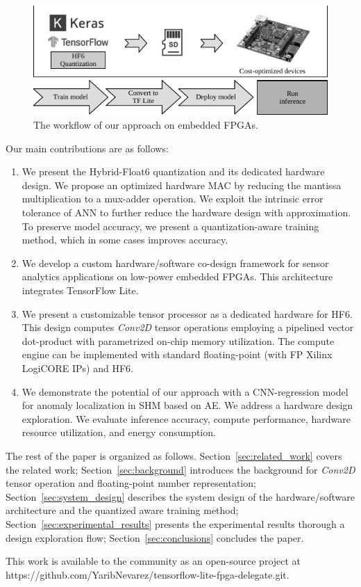 \begin{figure}[b!]
	\centering
	\includegraphics[width=0.5\columnwidth]{./chapters/cnn_accelerator/figures/workflow.pdf}
	\caption{The workflow of our approach on embedded FPGAs.}
	\label{fig:workflow}
\end{figure}

Our main contributions are as follows:
\begin{enumerate}
	\item
	
	We present the Hybrid-Float6 quantization and its dedicated hardware design. We propose an optimized hardware MAC by reducing the mantissa multiplication to a mux-adder operation. We exploit the intrinsic error tolerance of ANN to further reduce the hardware design with approximation. To preserve model accuracy, we present a quantization-aware training method, which in some cases improves accuracy.
	
	\item We develop a custom hardware/software co-design framework for sensor analytics applications on low-power embedded FPGAs. This architecture integrates TensorFlow Lite.
	\item We present a customizable tensor processor as a dedicated hardware for HF6. This design computes \emph{Conv2D} tensor operations employing a pipelined vector dot-product with parametrized on-chip memory utilization. The compute engine can be implemented with standard floating-point (with FP Xilinx LogiCORE IPs) and HF6.
	\item We demonstrate the potential of our approach with a CNN-regression model for anomaly localization in SHM based on AE. We address a hardware design exploration. We evaluate inference accuracy, compute performance, hardware resource utilization, and energy consumption.
\end{enumerate}

The rest of the paper is organized as follows. Section~\ref{sec:related_work} covers the related work; Section~\ref{sec:background} introduces the background for \emph{Conv2D} tensor operation and floating-point number representation; Section~\ref{sec:system_design} describes the system design of the hardware/software architecture and the quantized aware training method; Section~\ref{sec:experimental_results} presents the experimental results thorough a design exploration flow; Section~\ref{sec:conclusions} concludes the paper.

This work is available to the community as an open-source project at https://github.com/YaribNevarez/tensorflow-lite-fpga-delegate.git.